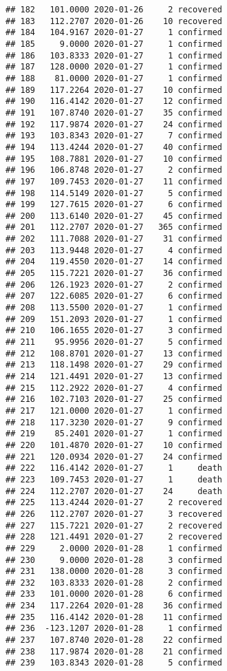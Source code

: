 \documentclass[
]{article}
\begin{document}
\begin{verbatim}
## 182   101.0000 2020-01-26     2 recovered
## 183   112.2707 2020-01-26    10 recovered
## 184   104.9167 2020-01-27     1 confirmed
## 185     9.0000 2020-01-27     1 confirmed
## 186   103.8333 2020-01-27     1 confirmed
## 187   128.0000 2020-01-27     1 confirmed
## 188    81.0000 2020-01-27     1 confirmed
## 189   117.2264 2020-01-27    10 confirmed
## 190   116.4142 2020-01-27    12 confirmed
## 191   107.8740 2020-01-27    35 confirmed
## 192   117.9874 2020-01-27    24 confirmed
## 193   103.8343 2020-01-27     7 confirmed
## 194   113.4244 2020-01-27    40 confirmed
## 195   108.7881 2020-01-27    10 confirmed
## 196   106.8748 2020-01-27     2 confirmed
## 197   109.7453 2020-01-27    11 confirmed
## 198   114.5149 2020-01-27     5 confirmed
## 199   127.7615 2020-01-27     6 confirmed
## 200   113.6140 2020-01-27    45 confirmed
## 201   112.2707 2020-01-27   365 confirmed
## 202   111.7088 2020-01-27    31 confirmed
## 203   113.9448 2020-01-27     4 confirmed
## 204   119.4550 2020-01-27    14 confirmed
## 205   115.7221 2020-01-27    36 confirmed
## 206   126.1923 2020-01-27     2 confirmed
## 207   122.6085 2020-01-27     6 confirmed
## 208   113.5500 2020-01-27     1 confirmed
## 209   151.2093 2020-01-27     1 confirmed
## 210   106.1655 2020-01-27     3 confirmed
## 211    95.9956 2020-01-27     5 confirmed
## 212   108.8701 2020-01-27    13 confirmed
## 213   118.1498 2020-01-27    29 confirmed
## 214   121.4491 2020-01-27    13 confirmed
## 215   112.2922 2020-01-27     4 confirmed
## 216   102.7103 2020-01-27    25 confirmed
## 217   121.0000 2020-01-27     1 confirmed
## 218   117.3230 2020-01-27     9 confirmed
## 219    85.2401 2020-01-27     1 confirmed
## 220   101.4870 2020-01-27    10 confirmed
## 221   120.0934 2020-01-27    24 confirmed
## 222   116.4142 2020-01-27     1     death
## 223   109.7453 2020-01-27     1     death
## 224   112.2707 2020-01-27    24     death
## 225   113.4244 2020-01-27     2 recovered
## 226   112.2707 2020-01-27     3 recovered
## 227   115.7221 2020-01-27     2 recovered
## 228   121.4491 2020-01-27     2 recovered
## 229     2.0000 2020-01-28     1 confirmed
## 230     9.0000 2020-01-28     3 confirmed
## 231   138.0000 2020-01-28     3 confirmed
## 232   103.8333 2020-01-28     2 confirmed
## 233   101.0000 2020-01-28     6 confirmed
## 234   117.2264 2020-01-28    36 confirmed
## 235   116.4142 2020-01-28    11 confirmed
## 236  -123.1207 2020-01-28     1 confirmed
## 237   107.8740 2020-01-28    22 confirmed
## 238   117.9874 2020-01-28    21 confirmed
## 239   103.8343 2020-01-28     5 confirmed

\end{verbatim}
\end{document}
